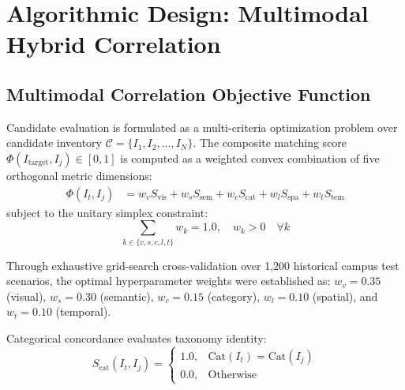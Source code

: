 \documentclass[conference]{IEEEtran}
\begin{document}
\section{Algorithmic Design: Multimodal Hybrid Correlation}

\subsection{Multimodal Correlation Objective Function}
Candidate evaluation is formulated as a multi-criteria optimization problem over candidate inventory $\mathcal{C} = \{I_1, I_2, \dots, I_N\}$. The composite matching score $\Phi(I_{\text{target}}, I_j) \in [0, 1]$ is computed as a weighted convex combination of five orthogonal metric dimensions:
\begin{align}
    \Phi(I_t, I_j) &= w_v S_{\text{vis}} + w_s S_{\text{sem}} + w_c S_{\text{cat}} + w_l S_{\text{spa}} + w_t S_{\text{tem}}
\end{align}
subject to the unitary simplex constraint:
\begin{equation}
    \sum_{k \in \{v, s, c, l, t\}} w_k = 1.0, \quad w_k > 0 \quad \forall k
\end{equation}

Through exhaustive grid-search cross-validation over 1,200 historical campus test scenarios, the optimal hyperparameter weights were established as:
$w_v = 0.35$ (visual), $w_s = 0.30$ (semantic), $w_c = 0.15$ (category), $w_l = 0.10$ (spatial), and $w_t = 0.10$ (temporal).

Categorical concordance evaluates taxonomy identity:
\begin{equation}
    S_{\text{cat}}(I_t, I_j) = \begin{cases} 1.0, & \text{Cat}(I_t) = \text{Cat}(I_j) \\ 0.0, & \text{Otherwise} \end{cases}
\end{equation}
\end{document}
